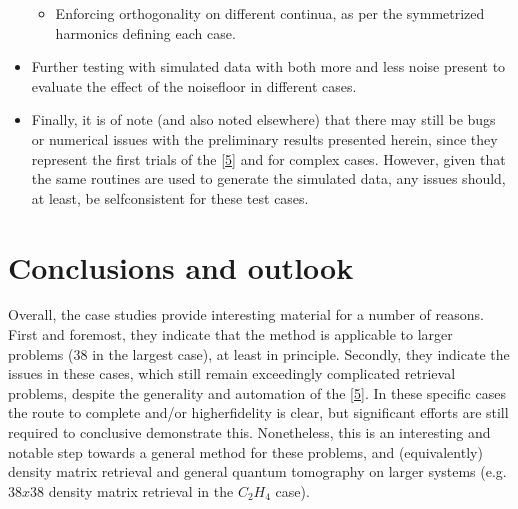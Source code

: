\documentclass[letterpaper,table,10pt,english]{jupyterBook}
\begin{document}
\begin{itemize}
\begin{itemize}
\item {} 
\sphinxAtStartPar
Enforcing orthogonality on different continua, as per the symmetrized harmonics defining each case.

\end{itemize}

\item {} 
\sphinxAtStartPar
Further testing with simulated data with both more and less noise present to evaluate the effect of the noise\sphinxhyphen{}floor in different cases.

\item {} 
\sphinxAtStartPar
Finally, it is of note (and also noted elsewhere) that there may still be bugs or numerical issues with the preliminary results presented herein, since they represent the first trials of the  {[}\hyperlink{cite.backmatter/bibliography:id680}{5}{]} and {\hyperref[\detokenize{backmatter/glossary:term-bootstrap-retrieval-protocol}]{}} for complex cases. However, given that the same routines are used to generate the simulated data, any issues should, at least, be self\sphinxhyphen{}consistent for these test cases.

\end{itemize}


\section{Conclusions and outlook}
\label{\detokenize{part2/case-study-summaries_240723:conclusions-and-outlook}}
\sphinxAtStartPar
Overall, the case studies provide interesting material for a number of reasons. First and foremost, they indicate that the {\hyperref[\detokenize{backmatter/glossary:term-bootstrap-retrieval-protocol}]{}} method is applicable to larger problems (38 {\hyperref[\detokenize{backmatter/glossary:term-radial-matrix-elements}]{}} in the largest case), at least in principle. Secondly, they indicate the issues in these cases, which still remain exceedingly complicated retrieval problems, despite the generality and automation of the  {[}\hyperlink{cite.backmatter/bibliography:id680}{5}{]}. In these specific cases the route to complete and/or higher\sphinxhyphen{}fidelity {\hyperref[\detokenize{backmatter/glossary:term-bootstrap-retrieval-protocol}]{}} is clear, but significant efforts are still required to conclusive demonstrate this. Nonetheless, this is an interesting and notable step towards a general method for these problems, and (equivalently) density matrix retrieval and general quantum tomography on larger systems (e.g. \(38x38\) density matrix retrieval in the \(C_2H_4\) case).
\end{document}
